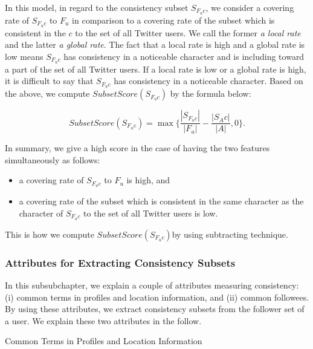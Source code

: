 In this model, in regard to the consistency subset $S_{F_uc}$, we
consider a covering rate of $S_{F_uc}$ to $F_u$ in comparison to a
covering rate of the subset which is consistent in the $c$ to the set of
all Twitter users.  We call the former \emph{a local rate} and the
latter \emph{a global rate}.  The fact that a local rate is high and a
global rate is low means $S_{F_uc}$ has consistency in a noticeable
character and is including toward a part of the set of all Twitter
users.  If a local rate is low or a global rate is high, it is difficult
to say that $S_{F_uc}$ has consistency in a noticeable character.  Based
on the above, we compute $\mathit{SubsetScore(S_{F_uc})}$ by the formula
below:

\vspace{-1ex}
\[
 \mathit{SubsetScore}(S_{F_uc}) = \max \{\frac{|S_{F_uc}|}{|F_u|} -
 \frac{|S_Ac|}{|A|}, 0\}.
\]
\vspace{-2ex}

In summary, we give a high score in the case of having the two features
simultaneously as follows:

\begin{itemize}
\item a covering rate of $S_{F_uc}$ to $F_u$ is high, and
\item a covering rate of the subset which is consistent in the same
      character as the character of $S_{F_uc}$ to the set of all Twitter
      users is low.
\end{itemize}

This is how we compute $\mathit{SubsetScore(S_{F_uc})}$by using
subtracting technique.

\subsubsection{Attributes for Extracting Consistency Subsets}
\label{subsubsec:Attributes}

In this subsubchapter, we explain a couple of attributes measuring
consistency: (i) common terms in profiles and location information, and
(ii) common followees.  By using these attributes, we extract
consistency subsets from the follower set of a user.  We explain these
two attributes in the follow.

\begin{description}
 \bf {\item[(i)] Common Terms in Profiles and Location Information}
\end{description}

